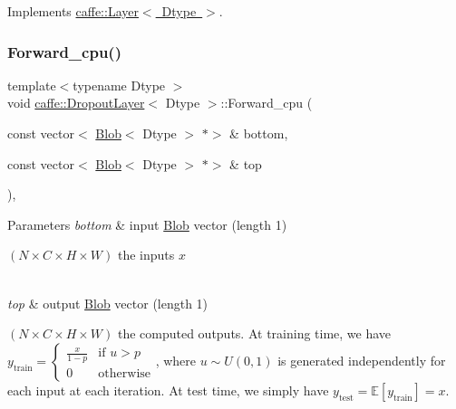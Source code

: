 Implements \mbox{\hyperlink{classcaffe_1_1_layer_a576ac6a60b1e99fe383831f52a6cea77}{caffe\+::\+Layer$<$ Dtype $>$}}.

\mbox{\label{classcaffe_1_1_dropout_layer_af3d3f94306230950edf514e0fbb8f710}} 
\subsubsection{\texorpdfstring{Forward\+\_\+cpu()}{Forward\_cpu()}\hspace{0.1cm}{\footnotesize\ttfamily [2/2]}}
{\footnotesize\ttfamily template$<$typename Dtype $>$ \\
void \mbox{\hyperlink{classcaffe_1_1_dropout_layer}{caffe\+::\+Dropout\+Layer}}$<$ Dtype $>$\+::Forward\+\_\+cpu (\begin{DoxyParamCaption}\item[{const vector$<$ \mbox{\hyperlink{classcaffe_1_1_blob}{Blob}}$<$ Dtype $>$ $\ast$$>$ \&}]{bottom,  }\item[{const vector$<$ \mbox{\hyperlink{classcaffe_1_1_blob}{Blob}}$<$ Dtype $>$ $\ast$$>$ \&}]{top }\end{DoxyParamCaption})\hspace{0.3cm}{\ttfamily [protected]}, {\ttfamily [virtual]}}


\begin{DoxyParams}{Parameters}
{\em bottom} & input \mbox{\hyperlink{classcaffe_1_1_blob}{Blob}} vector (length 1)
\begin{DoxyEnumerate}
\item $ (N \times C \times H \times W) $ the inputs $ x $ 
\end{DoxyEnumerate}\\
\hline
{\em top} & output \mbox{\hyperlink{classcaffe_1_1_blob}{Blob}} vector (length 1)
\begin{DoxyEnumerate}
\item $ (N \times C \times H \times W) $ the computed outputs. At training time, we have $ y_{\mbox{train}} = \left\{ \begin{array}{ll} \frac{x}{1 - p} & \mbox{if } u > p \\ 0 & \mbox{otherwise} \end{array} \right. $, where $ u \sim U(0, 1)$ is generated independently for each input at each iteration. At test time, we simply have $ y_{\mbox{test}} = \mathbb{E}[y_{\mbox{train}}] = x $. 
\end{DoxyEnumerate}\\
\hline
\end{DoxyParams}


